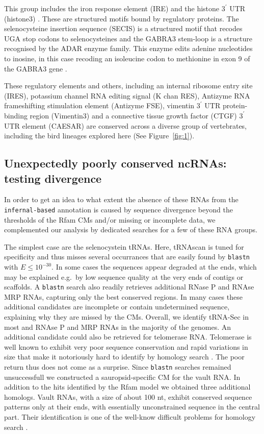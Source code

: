 \documentclass[10pt]{bmc_article}
\newenvironment{bmcformat}{\begin{raggedright}\baselineskip20pt\sloppy\setboolean{publ}{false}}{\end{raggedright}\baselineskip20pt\sloppy}
\begin{document}
\begin{bmcformat}
This group includes the iron response element (IRE) \cite{Stevens:}
and the histone $3^\prime$ UTR (histone3)
\cite{Davila_Lopez:2008a}. These are structured motifs bound by
regulatory proteins. The selenocysteine insertion sequence (SECIS) is
a structured motif that recodes UGA stop codons to selenocysteines
\cite{Lambert:2002} and the GABRA3 stem-loop is a structure recognised
by the ADAR enzyme family. This enzyme edits adenine nucleotides to
inosine, in this case recoding an isoleucine codon to methionine in
exon 9 of the GABRA3 gene \cite{Ohlson:2007}.

These regulatory elements and others, including an internal ribosome
entry site (IRES), potassium channel RNA editing signal (K chan RES),
Antizyme RNA frameshifting stimulation element (Antizyme FSE),
vimentin $3^\prime$ UTR protein-binding region (Vimentin3) and a
connective tissue growth factor (CTGF) $3^\prime$ UTR element (CAESAR)
are conserved across a diverse group of vertebrates, including the
bird lineages explored here (See Figure~\ref{fig:1}).

\subsection*{Unexpectedly poorly conserved  ncRNAs: testing divergence}

In order to get an idea to what extent the
absence of these RNAs from the \texttt{infernal-based} annotation is
caused by sequence divergence beyond the thresholds of the Rfam CMs
and/or missing or incomplete data, we complemented our analysis by
dedicated searches for a few of these RNA groups.

The simplest case are the selenocystein tRNAs. Here, tRNAscan is tuned
for specificity and thus misses several occurrances that are easily
found by \texttt{blastn} with $E\le 10^{-30}$. In some cases the
sequences appear degraded at the ends, which may be explained e.g.\ by
low sequence quality at the very ends of contigs or scaffolds. A
\texttt{blastn} search also readily retrieves additional RNase P and
RNAse MRP RNAs, capturing only the best conserved regions. In many
cases these additional candidates are incomplete or contain
undetermined sequence, explaining why they are missed by the
CMs. Overall, we identify tRNA-Sec in most and RNAse P and MRP RNAs in
the majority of the genomes. An additional candidate could also be
retrieved for telomerase RNA. Telomerase is well known to exhibit very
poor sequence conservation and rapid variations in size that make it
notoriously hard to identify by homology search \cite{Xie:08a}. The
poor return thus does not come as a surprise. Since \texttt{blastn}
searches remained unsuccessfull we constructed a sauropsid-specific CM
for the vault RNA. In addition to the hits identified by the Rfam
model we obtained three additional homologs. Vault RNAs, with a size
of about 100 nt, exhibit conserved sequence patterns only at their
ends, with essentially unconstrained sequence in the central
part. Their identification is one of the well-know difficult problems
for homology search \cite{Stadler:09b,Kolbe:2009}.


\end{bmcformat}
\end{document}
